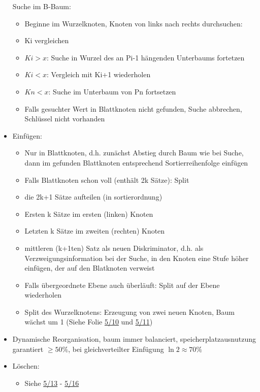 \documentclass[a4paper, 12pt]{scrartcl}
\begin{document}
\begin{itemize}
		Suche im B-Baum:
		\begin{itemize}
			\item
				Beginne im Wurzelknoten, Knoten von links nach rechts durchsuchen:
			\item
				Ki vergleichen
			\item
				$Ki > x$: Suche in Wurzel des an Pi-1 hängenden Unterbaums fortetzen
			\item
				$Ki < x$: Vergleich mit Ki+1 wiederholen
			\item
				$Kn < x$: Suche im Unterbaum von Pn fortsetzen
			\item
				Falls gesuchter Wert in Blattknoten nicht gefunden, Suche abbrechen, Schlüssel nicht vorhanden
		\end{itemize}
	\item
		Einfügen:
		\begin{itemize}
			\item
				Nur in Blattknoten, d.h. zunächst Abstieg durch Baum wie bei Suche, dann im gefunden Blattknoten entsprechend Sortierreihenfolge einfügen
			\item
				Falls Blattknoten schon voll (enthält 2k Sätze): Split
			\item
				die 2k+1 Sätze aufteilen (in sortierordnung)
			\item
				Ersten k Sätze im ersten (linken) Knoten
			\item
				Letzten k Sätze im zweiten (rechten) Knoten
			\item
				mittleren (k+1ten) Satz als neuen Diskriminator, d.h. als Verzweigungsinformation bei der Suche, in den Knoten eine Stufe höher einfügen, der auf den Blatknoten verweist
			\item
				Falls übergeordnete Ebene auch überläuft: Split auf der Ebene wiederholen
			\item
				Split des Wurzelknotens: Erzeugung von zwei neuen Knoten, Baum wächst um 1 (Siehe Folie \href{run:IDB-2015WS-05-Schluessel-Teil-2.pdf}{5/10} und \href{run:IDB-2015WS-05-Schluessel-Teil-2.pdf}{5/11})
		\end{itemize}
	\item
		Dynamische Reorganisation, baum immer balanciert, speicherplatzausnutzung garantiert $\geq 50\%$, bei gleichverteilter Einfügung $\ln 2 \approx 70\%$
	\item
		Löschen:
		\begin{itemize}
			\item
				Siehe \href{run:IDB-2015WS-05-Schluessel-Teil-2.pdf}{5/13} - \href{run:IDB-2015WS-05-Schluessel-Teil-2.pdf}{5/16}

\end{itemize}
\end{itemize}
\end{document}
